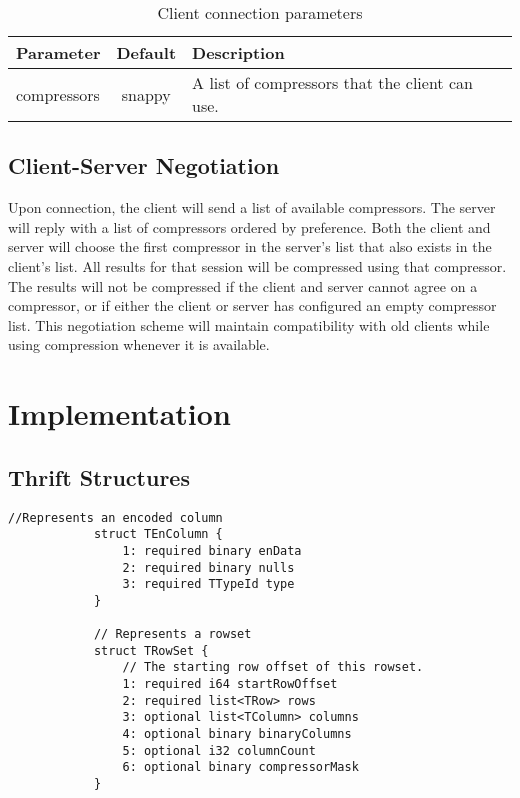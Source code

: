 \documentclass[11pt,a4paper]{article}
\begin{document}
		\begin{table}[H]
			\begin{tabular}{| p{3cm} | c | p{6.5cm} |} \hline
				\textbf{Parameter} & \textbf{Default} & \textbf{Description} \\ \hline
				compressors
				& snappy & A list of compressors that the client can use. 
				\\ \hline
			\end{tabular}
			\caption{Client connection parameters}
		\end{table}
		
		\subsection{Client-Server Negotiation}
		Upon connection, the client will send a list of available compressors. The server will reply with a list of compressors ordered by preference.
		Both the client and server will choose the first compressor in the server's list that also exists in the client's list.
		All results for that session will be compressed using that compressor.
		The results will not be compressed if the client and server cannot agree on a compressor, or if either the client or server has configured an empty compressor list.
		This negotiation scheme will maintain compatibility with old clients while using compression whenever it is available.
		
\section{Implementation}
	
	\subsection{Thrift Structures}
		
		\begin{lstlisting}[title=TCLIService.thrift,gobble=6,otherkeywords={binary,i32,i64,string,struct,TColumn,TEnColumn,TRow,TRowSet,TTypeId}]
			//Represents an encoded column
			struct TEnColumn {
				1: required binary enData
				2: required binary nulls
				3: required TTypeId type
			}
			
			// Represents a rowset
			struct TRowSet {
				// The starting row offset of this rowset.
				1: required i64 startRowOffset
				2: required list<TRow> rows
				3: optional list<TColumn> columns
				4: optional binary binaryColumns
				5: optional i32 columnCount
				6: optional binary compressorMask
			}
		\end{lstlisting}
		
\end{document}
